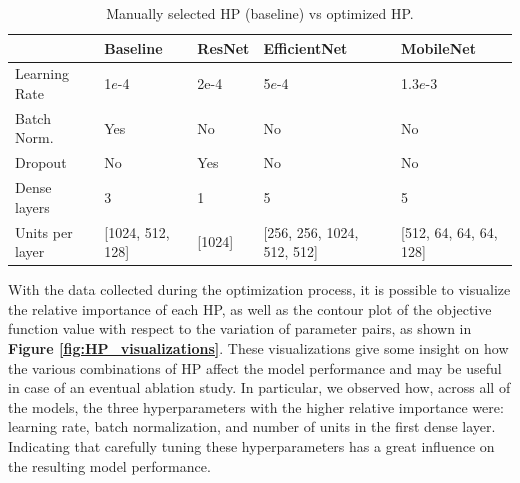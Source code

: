 \begin{table}[ht!]
    \begin{tabularx}{\textwidth}{YYYYY}
        \hline
                          & \textbf{Baseline}   & \textbf{ResNet}   & \textbf{EfficientNet} & \textbf{MobileNet} \\\hline 
          Learning Rate         & 1$e$-4        & 2e-4              & 5$e$-4                &  1.3$e$-3     \\ 
          Batch Norm.           & Yes           & No                & No                    &  No           \\ 
          Dropout               & No            & Yes               & No                    &  No           \\ 
          Dense layers          & 3             & 1                 & 5                     &  5            \\ 
          Units per layer       &[1024, 512, 128] & [1024]          & [256, 256, 1024, 512, 512]&[512, 64, 64, 64, 128]\\ \hline
    \end{tabularx}
    \caption{Manually selected HP (baseline) vs optimized HP.}
    \label{tab:HPselection}
\end{table}
\noindent
With the data collected during the optimization process, it is possible to visualize the relative importance of each HP, as well as the contour plot of the objective function value with respect to the variation of parameter pairs, as shown in \textbf{Figure \ref{fig:HP_visualizations}}. These visualizations give some insight on how the various combinations of HP affect the model performance and may be useful in case of an eventual ablation study.
In particular, we observed how, across all of the models, the three hyperparameters with the higher relative importance were: learning rate, batch normalization, and number of units in the first dense layer. Indicating that carefully tuning these hyperparameters has a great influence on the resulting model performance.

